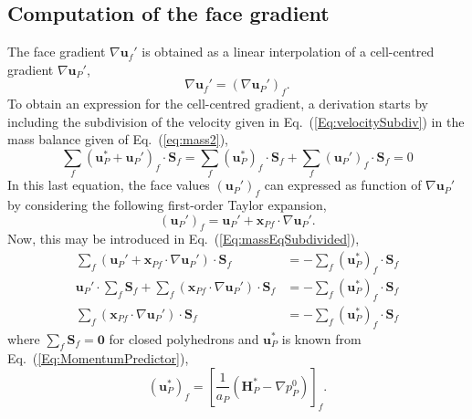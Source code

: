 \documentclass[final,3p,times,11pt,onecolumn]{myElsarticle}
\numberwithin{equation}{section}
\begin{document}
\subsection{Computation of the face gradient}
The face gradient $\nabla \boldsymbol{u}_f' $ is obtained as a linear interpolation of a cell-centred gradient $\nabla \boldsymbol{u}_P'$,
\begin{equation}
\label{Eq:UFaceGradient}
\nabla \boldsymbol{u}_f'
=
(\nabla \boldsymbol{u}_P')_f.
\end{equation}
To obtain an expression for the cell-centred gradient, a derivation starts by including the subdivision of the velocity given in Eq.~(\ref{Eq:velocitySubdiv}) in the mass balance given of Eq.~(\ref{eq:mass2}),
\begin{equation}
\label{Eq:massEqSubdivided}
\sum_{f} 
\left(
\boldsymbol{u}_{P}^*
+ 
\boldsymbol{u}_{P}'
\right)_f
\cdotp \textbf{S}_{f} 
=
\sum_{f} 
\left(
\boldsymbol{u}_{P}^*
\right)_f
\cdotp \textbf{S}_{f}
+
\sum_{f} 
\left(
\boldsymbol{u}_{P}'
\right)_f
\cdotp \textbf{S}_{f}
=
0
\end{equation}
In this last equation, the face values $\left(\boldsymbol{u}_P'\right)_f$ can expressed as function of $\nabla \boldsymbol{u}_P'$ by considering the following first-order Taylor expansion,
\begin{equation}
\label{Eq:TaylorOnFace}
\left(
\boldsymbol{u}_P'
\right)_f
=
\boldsymbol{u}_P'
+
\boldsymbol{x}_{Pf}
\cdot 
\nabla \boldsymbol{u}_P'.
\end{equation} 
Now, this may be introduced in Eq.~(\ref{Eq:massEqSubdivided}),
\begin{align}
\sum_f 
\left(
\boldsymbol{u}_P'
+
\boldsymbol{x}_{Pf}
\cdot 
\nabla \boldsymbol{u}_P'
\right)
\cdot 
\boldsymbol{S}_f 
&=
-\sum_f
\left(
\boldsymbol{u}_P^{*}
\right)_{f} 
\cdot 
\boldsymbol{S}_f
\\
\boldsymbol{u}_P'
\cdot 
\sum_f 
\boldsymbol{S}_f
+
\sum_f 
\left(
\boldsymbol{x}_{Pf}
\cdot 
\nabla \boldsymbol{u}_P'
\right)
\cdot 
\boldsymbol{S}_f
&=
-\sum_f
\left(
\boldsymbol{u}_P^{*}
\right)_{f} 
\cdot 
\boldsymbol{S}_f
\\
\label{Eq:Last}
\sum_f 
\left(
\boldsymbol{x}_{Pf}
\cdot 
\nabla \boldsymbol{u}_P'
\right)
\cdot 
\boldsymbol{S}_f
&=
-\sum_f
\left(
\boldsymbol{u}_P^{*}
\right)_{f} 
\cdot 
\boldsymbol{S}_f
\end{align}
where $\sum_f \boldsymbol{S}_f = \boldsymbol{0}$ for closed polyhedrons and $\boldsymbol{u}_P^{*}$ is known from Eq.~(\ref{Eq:MomentumPredictor}),
\begin{equation}
\left(
\boldsymbol{u}_P^{*}
\right)_{f}
=
\left[\frac{1}{a_P}\left(\boldsymbol{H}_P^* - \nabla p_P^{0}\right)\right]_f.
\end{equation}
\end{document}
